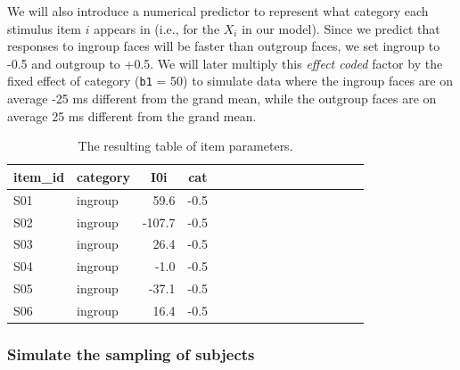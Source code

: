 \documentclass[doc,floatsintext]{apa6}
\newenvironment{Shaded}{\begin{snugshade}}{\end{snugshade}}
\newcommand{\CommentTok}[1]{\textcolor[rgb]{0.56,0.35,0.01}{\textit{#1}}}
\newcommand{\FloatTok}[1]{\textcolor[rgb]{0.00,0.00,0.81}{#1}}
\newcommand{\KeywordTok}[1]{\textcolor[rgb]{0.13,0.29,0.53}{\textbf{#1}}}
\newcommand{\NormalTok}[1]{#1}
\newcommand{\OperatorTok}[1]{\textcolor[rgb]{0.81,0.36,0.00}{\textbf{#1}}}
\newcommand{\StringTok}[1]{\textcolor[rgb]{0.31,0.60,0.02}{#1}}
\begin{document}
We will also introduce a numerical predictor to represent what category each stimulus item \(i\) appears in (i.e., for the \(X_i\) in our model). Since we predict that responses to ingroup faces will be faster than outgroup faces, we set ingroup to -0.5 and outgroup to +0.5. We will later multiply this \emph{effect coded} factor by the fixed effect of category (\texttt{b1} = 50) to simulate data where the ingroup faces are on average -25 ms different from the grand mean, while the outgroup faces are on average 25 ms different from the grand mean.

\begin{Shaded}
\end{Shaded}

\begin{table}[H]
\begin{center}
\begin{threeparttable}
\caption{\label{tab:items-table}The resulting table of item parameters.}
\begin{tabular}{llrrllrrllrrllrr}
\toprule
item\_id & \multicolumn{1}{c}{category} & \multicolumn{1}{c}{I0i} & \multicolumn{1}{c}{cat}\\
\midrule
S01 & ingroup & 59.6 & -0.5\\
S02 & ingroup & -107.7 & -0.5\\
S03 & ingroup & 26.4 & -0.5\\
S04 & ingroup & -1.0 & -0.5\\
S05 & ingroup & -37.1 & -0.5\\
S06 & ingroup & 16.4 & -0.5\\
\bottomrule
\end{tabular}
\end{threeparttable}
\end{center}
\end{table}

\hypertarget{simulate-the-sampling-of-subjects}{%
\subsubsection{Simulate the sampling of subjects}\label{simulate-the-sampling-of-subjects}}
\end{document}
